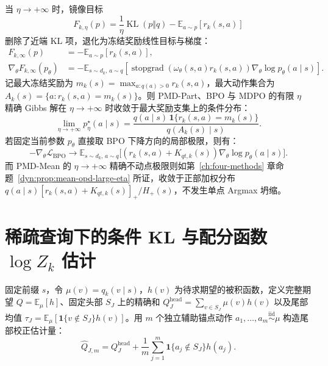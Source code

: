 \documentclass[lang=cn,scheme=chinese,openany]{elegantbook}
\newcommand{\E}{\mathbb E}
\newcommand{\sg}{\operatorname{stopgrad}}
\begin{document}
当 $\eta\to+\infty$ 时，镜像目标
\begin{equation}
\label{eq:ch2-opd-mirror-objective-eta}
F_{k,\eta}(p)=\frac{1}{\eta}\operatorname{KL}(p\Vert q)-\mathbb E_{a\sim p}[r_k(s,a)]
\end{equation}
删除了近端 KL 项，退化为冻结奖励线性目标与梯度：
\begin{align}
\label{eq:ch2-opd-frozen-reward-objective}
F_{k,\infty}(p)&=-\mathbb E_{a\sim p}[r_k(s,a)],\\
\label{eq:ch2-opd-frozen-reward-gradient}
\nabla_\theta F_{k,\infty}(p_\theta)
&=-\mathbb E_{s\sim d_k,\,a\sim q}
\left[\sg\!\left(\omega_\theta(s,a)r_k(s,a)\right)
\nabla_\theta\log p_\theta(a\mid s)\right].
\end{align}
记最大冻结奖励为 $m_k(s)=\max_{a:q(a)>0}r_k(s,a)$，最大动作集合为 $A_k(s)=\{a:r_k(s,a)=m_k(s)\}$。则 PMD-Part、BPO 与 MDPO 的有限 $\eta$ 精确 Gibbs 解在 $\eta\to+\infty$ 时收敛于最大奖励支集上的条件分布：
\begin{equation}
\lim_{\eta\to+\infty}p^\star_{\eta}(a\mid s)
=\frac{q(a\mid s)\,\mathbf 1\{r_k(s,a)=m_k(s)\}}
{q(A_k(s)\mid s)}.
\label{eq:ch2-opd-bpo-infinity-target}
\end{equation}
若固定当前参数 $p_\theta$ 直接取 BPO 下降方向的局部极限，则有：
\begin{equation}
-\nabla_\theta\mathcal L_{\mathrm{BPO}}
\longrightarrow
\mathbb E_{s\sim d_k,\,a\sim q}
\bigl[(r_k(s,a)+K_{qt,k}(s))\nabla_\theta\log p_\theta(a\mid s)\bigr].
\label{eq:ch2-opd-bpo-infinity-gradient}
\end{equation}而 PMD-Mean 的 $\eta\to+\infty$ 精确不动点极限则如第~\ref{ch:four-methods} 章命题~\ref{dyn:prop:mean-opd-large-eta} 所证，收敛于正部加权分布 $q(a\mid s)[r_k(s,a)+K_{qt,k}(s)]_+/H_+(s)$，不发生单点 Argmax 坍缩。

\section{稀疏查询下的条件 KL 与配分函数 \texorpdfstring{$\log Z_k$}{log Zk} 估计}
\label{sec:ch2-opd-z-kl-estimation}

固定前缀 $s$，令 $\mu(v)=q_k(v\mid s)$，$h(v)$ 为待求期望的被积函数，定义完整期望 $Q=\E_\mu[h]$、固定头部 $S_J$ 上的精确和 $Q_J^{\mathrm{head}}=\sum_{v\in S_J}\mu(v)h(v)$ 以及尾部均值 $\tau_J=\E_\mu[\mathbf1\{v\notin S_J\}h(v)]$。用 $m$ 个独立辅助锚点动作 $a_1,\ldots,a_m\overset{\mathrm{iid}}\sim\mu$ 构造尾部校正估计量：
\begin{equation}
\widehat Q_{J,m}=Q_J^{\mathrm{head}}+
\frac1m\sum_{j=1}^{m}\mathbf 1\{a_j\notin S_J\}h(a_j).
\label{eq:ch2-opd-generic-tail,eq:ch2-opd-generic-topk,eq:ch2-opd-topk-anchor-kl}
\end{equation}
\end{document}

